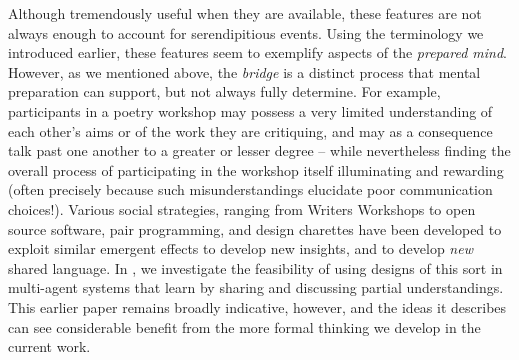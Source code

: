Although tremendously useful when they are available, these features
are not always enough to account for serendipitious events.  Using the
terminology we introduced earlier, these features seem to exemplify
aspects of the \emph{prepared mind}.  However, as we mentioned above,
the \emph{bridge} is a distinct process that mental preparation can
support, but not always fully determine.  For example, participants in
a poetry workshop may possess a very limited understanding of each
other's aims or of the work they are critiquing, and may as a
consequence talk past one another to a greater or lesser degree --
while nevertheless finding the overall process of participating in the
workshop itself illuminating and rewarding (often precisely because
such misunderstandings elucidate poor communication choices!).
Various social strategies, ranging from Writers Workshops to open
source software, pair programming, and design charettes
\cite[p. 11]{gabriel2002writer} have been developed to exploit similar
emergent effects to develop new insights, and to develop \emph{new}
shared language.  In \cite{poetry-workshop}, we investigate the
feasibility of using designs of this sort in multi-agent systems that
learn by sharing and discussing partial understandings.  This earlier
paper remains broadly indicative, however, and the ideas it describes
can see considerable benefit from the more formal thinking we develop
in the current work.

